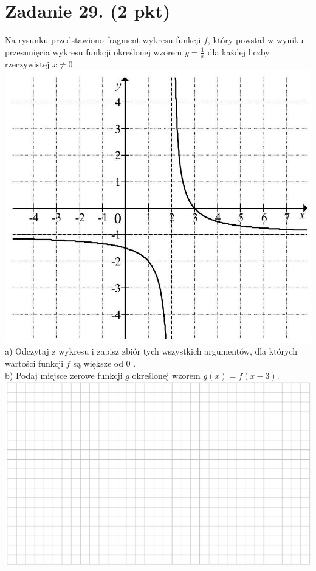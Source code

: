\documentclass[10pt]{article}
\begin{document}
\section*{Zadanie 29. (2 pkt)}
Na rysunku przedstawiono fragment wykresu funkcji \(f\), który powstał w wyniku przesunięcia wykresu funkcji określonej wzorem \(y=\frac{1}{x}\) dla każdej liczby rzeczywistej \(x \neq 0\).\\
\includegraphics[max width=\textwidth, center]{2024_11_21_0c267759828927e3a26dg-13}\\
a) Odczytaj z wykresu i zapisz zbiór tych wszystkich argumentów, dla których wartości funkcji \(f\) są większe od 0 .\\
b) Podaj miejsce zerowe funkcji \(g\) określonej wzorem \(g(x)=f(x-3)\).\\
\includegraphics[max width=\textwidth, center]{2024_11_21_0c267759828927e3a26dg-13(2)}
\end{document}
